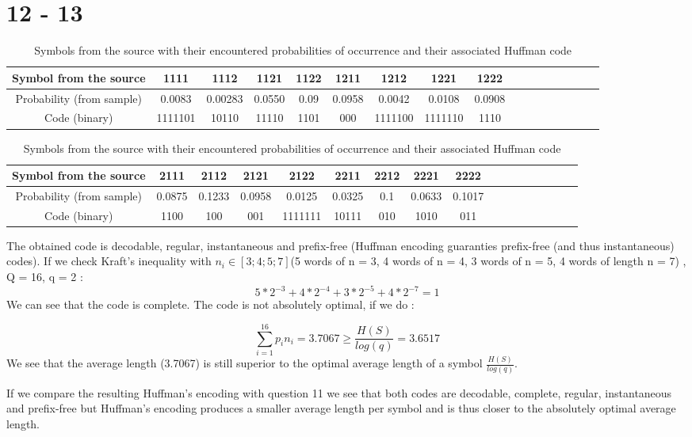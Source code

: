 \documentclass[a4paper,12pt]{article}
\begin{document}
\section*{12 - 13}

\begin{table}[h!]

\begin{center}

\begin{adjustbox}{max width=\linewidth}
\begin{tabular}{|c|c|c|c|c|c|c|c|c|c|c|c|c|c|c|c|c|}
 \hline 
 Symbol from the source & 1111 & 1112 & 1121 & 1122 & 1211 & 1212 & 1221 & 1222 \\ 
 \hline 
 Probability (from sample) & 0.0083 & 0.00283 & 0.0550 & 0.09 & 0.0958 & 0.0042 & 0.0108 & 0.0908  \\ 
 \hline 
 Code (binary) & 1111101 & 10110 & 11110 & 1101 & 000 & 1111100 & 1111110 & 1110  \\ 
 \hline 
\end{tabular}
\end{adjustbox}

\begin{adjustbox}{max width=\linewidth}
\begin{tabular}{|c|c|c|c|c|c|c|c|c|c|c|c|c|c|c|c|c|}
 \hline 
 Symbol from the source & 2111 & 2112 & 2121 & 2122 & 2211 & 2212 & 2221 & 2222 \\ 
 \hline 
 Probability (from sample) & 0.0875 & 0.1233 & 0.0958 & 0.0125 & 0.0325 & 0.1 & 0.0633 & 0.1017 \\ 
 \hline 
 Code (binary) & 1100 & 100 & 001 & 1111111 & 10111 & 010 & 1010 & 011 \\ 
 \hline 
\end{tabular}
\end{adjustbox}
\end{center}
\caption{Symbols from the source with their encountered probabilities of occurrence and their associated Huffman code}  
\end{table}


The obtained code is decodable, regular, instantaneous and prefix-free (Huffman encoding guaranties  prefix-free (and thus instantaneous) codes). If we check Kraft's inequality with $n_i \in [3;4;5;7]$(5 words of n = 3, 4 words of n = 4, 3 words of n = 5, 4 words of length n = 7) , Q = 16, q = 2 :
\begin{equation}
5 * 2^{-3} + 4 * 2^{-4} + 3 * 2^{-5} + 4 * 2^{-7} =  1
\end{equation}
We can see that the code is complete. The code is not absolutely optimal, if we do :

\begin{equation}
\sum_{i=1}^{16} p_i n_i = 3.7067 \geq \frac{H(S)}{log(q)} = 3.6517
\end{equation} 
We see that the average length (3.7067) is still superior to the optimal average length of a symbol $\frac{H(S)}{log(q)}$.

If we compare the resulting Huffman's encoding with question 11 we see that both codes are decodable, complete, regular, instantaneous and prefix-free but Huffman's encoding produces a smaller average length per symbol and is thus closer to the absolutely optimal average length. 
\end{document}
